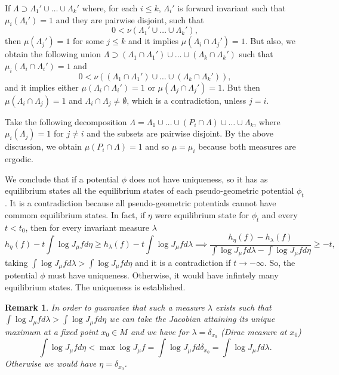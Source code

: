 \documentclass[12pt,a4paper]{amsart}
\theoremstyle{plain}
\newtheorem{remark}{Remark}[subsection]
\begin{document}
If $\Lambda \supset \Lambda_{1}' \cup \dots \cup \Lambda_{k}'$ where, for each $i \leq k$, $\Lambda_{i}'$ is forward invariant such that $\mu_{i}(\Lambda_{i}') = 1$ and they are pairwise disjoint, such that
\[
0 <  \nu(\Lambda_{1}' \cup \dots \cup \Lambda_{k}'),
\]
then $\mu(\Lambda_{j}')=1$ for some $j \leq k$ and it implies $\mu(\Lambda_{i} \cap \Lambda_{j}')=1$. But also, we obtain the following union $\Lambda \supset (\Lambda_{1} \cap \Lambda_{1}') \cup \dots \cup (\Lambda_{k} \cap \Lambda_{k}')$ such that $\mu_{i}(\Lambda_{i} \cap \Lambda_{i}') = 1$ and
\[
0 <  \nu((\Lambda_{1} \cap \Lambda_{1}') \cup \dots \cup (\Lambda_{k} \cap \Lambda_{k}')),
\]
and it implies either $\mu(\Lambda_{i} \cap \Lambda_{i}') = 1$ or $\mu(\Lambda_{j} \cap \Lambda_{j}') = 1$. But then $\mu(\Lambda_{i} \cap \Lambda_{j}) = 1$ and $\Lambda_{i} \cap \Lambda_{j} \neq \emptyset$, which is a contradiction, unless $j = i$.

Take the following decomposition $\Lambda = \Lambda_{1} \cup \dots \cup (P_{i} \cap \Lambda) \cup \dots \cup \Lambda_{k}$, where $\mu_{i}(\Lambda_{j}) = 1$ for $j \neq i$ and the subsets are pairwise disjoint. By the above discussion, we obtain $\mu(P_{i} \cap \Lambda) =1$ and so $\mu = \mu_{i}$ because both measures are ergodic.

We conclude that if a potential $\phi$ does not have uniqueness, so it has as equilibrium states all the equilibrium states of each pseudo-geometric potential $\phi_{t}$. It is a contradiction because all pseudo-geometric potentials cannot have commom equilibrium states. In fact, if $\eta$ were equilibrium state for  $\phi_{t}$ and every $t < t_{0}$, then for every invariant measure $\lambda$
\[
h_{\eta}(f) - t\int \log J_{\mu}f d\eta \geq h_{\lambda}(f) - t\int \log J_{\mu}f  d\lambda \implies \frac{h_{\eta}(f) - h_{\lambda}(f)}{\int \log J_{\mu}f d\lambda - \int \log J_{\mu}f d\eta} \geq -t,
\]
taking $\int \log J_{\mu}f d\lambda > \int \log J_{\mu}f d\eta$ and it is a contradiction if $t \to -\infty$. So, the potential $\phi$ must have uniqueness. Otherwise, it would have infintely many equilibrium states. The uniqueness is established.

\begin{remark}
	In order to guarantee that such a measure $\lambda$ exists  such that $\int \log J_{\mu}f d\lambda > \int \log J_{\mu}f d\eta$ we can take the Jacobian attaining its unique maximum at a fixed point $x_{0} \in M$ and we have for $\lambda = \delta_{x_{0}}$ (Dirac measure at $x_{0}$)
	\[
	\int \log J_{\mu}f d\eta < \max \log J_{\mu}f = \int \log J_{\mu}f d\delta_{x_{0}} = \int \log J_{\mu}f d\lambda.
	\]
	Otherwise we would have $\eta = \delta_{x_{0}}$.
\end{remark}
\end{document}
